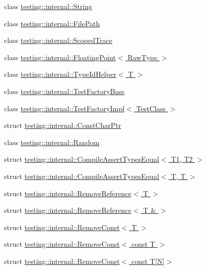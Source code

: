 \begin{DoxyCompactItemize}
class \hyperlink{classtesting_1_1internal_1_1_string}{testing\-::internal\-::\-String}
\item 
class \hyperlink{classtesting_1_1internal_1_1_file_path}{testing\-::internal\-::\-File\-Path}
\item 
class \hyperlink{classtesting_1_1internal_1_1_scoped_trace}{testing\-::internal\-::\-Scoped\-Trace}
\item 
class \hyperlink{classtesting_1_1internal_1_1_floating_point}{testing\-::internal\-::\-Floating\-Point$<$ Raw\-Type $>$}
\item 
class \hyperlink{classtesting_1_1internal_1_1_type_id_helper}{testing\-::internal\-::\-Type\-Id\-Helper$<$ T $>$}
\item 
class \hyperlink{classtesting_1_1internal_1_1_test_factory_base}{testing\-::internal\-::\-Test\-Factory\-Base}
\item 
class \hyperlink{classtesting_1_1internal_1_1_test_factory_impl}{testing\-::internal\-::\-Test\-Factory\-Impl$<$ Test\-Class $>$}
\item 
struct \hyperlink{structtesting_1_1internal_1_1_const_char_ptr}{testing\-::internal\-::\-Const\-Char\-Ptr}
\item 
class \hyperlink{classtesting_1_1internal_1_1_random}{testing\-::internal\-::\-Random}
\item 
struct \hyperlink{structtesting_1_1internal_1_1_compile_assert_types_equal}{testing\-::internal\-::\-Compile\-Assert\-Types\-Equal$<$ T1, T2 $>$}
\item 
struct \hyperlink{structtesting_1_1internal_1_1_compile_assert_types_equal_3_01_t_00_01_t_01_4}{testing\-::internal\-::\-Compile\-Assert\-Types\-Equal$<$ T, T $>$}
\item 
struct \hyperlink{structtesting_1_1internal_1_1_remove_reference}{testing\-::internal\-::\-Remove\-Reference$<$ T $>$}
\item 
struct \hyperlink{structtesting_1_1internal_1_1_remove_reference_3_01_t_01_6_01_4}{testing\-::internal\-::\-Remove\-Reference$<$ T \& $>$}
\item 
struct \hyperlink{structtesting_1_1internal_1_1_remove_const}{testing\-::internal\-::\-Remove\-Const$<$ T $>$}
\item 
struct \hyperlink{structtesting_1_1internal_1_1_remove_const_3_01const_01_t_01_4}{testing\-::internal\-::\-Remove\-Const$<$ const T $>$}
\item 
struct \hyperlink{structtesting_1_1internal_1_1_remove_const_3_01const_01_t[_n]_4}{testing\-::internal\-::\-Remove\-Const$<$ const T\mbox{[}\-N\mbox{]}$>$}

\end{DoxyCompactItemize}
